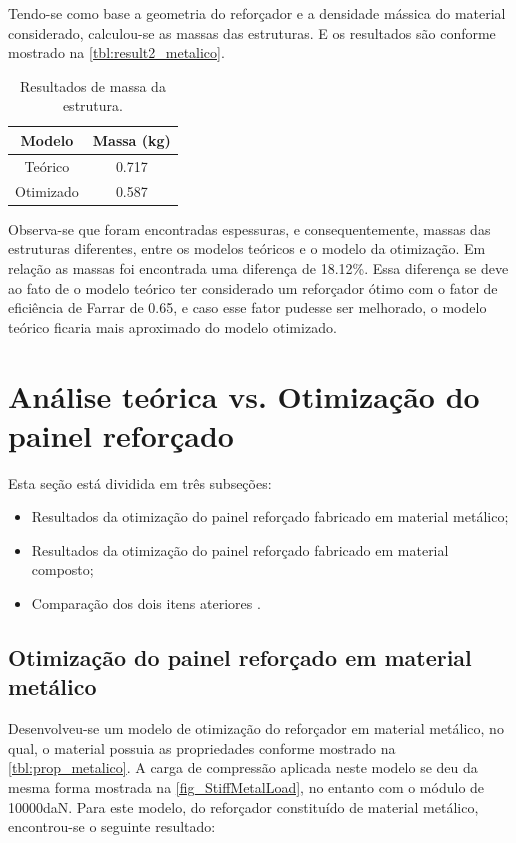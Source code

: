 Tendo-se como base a geometria do reforçador e a densidade mássica do material considerado, calculou-se as massas das estruturas. E os resultados são conforme mostrado na \autoref{tbl:result2_metalico}.

\begin{table}[h]
\centering
\begin{tabular}{cc}
\toprule
Modelo & Massa (kg) \\ \midrule
Teórico & 0.717\\
Otimizado & 0.587\\
\bottomrule
\end{tabular}
\caption{Resultados de massa da estrutura.}
\label{tbl:result2_metalico}
\end{table}

Observa-se que foram encontradas espessuras, e consequentemente, massas das estruturas diferentes, entre os modelos teóricos e o modelo da otimização.
Em relação as massas foi encontrada uma diferença de 18.12\%. Essa diferença se deve ao fato de o modelo teórico ter considerado um reforçador ótimo com o fator de eficiência de Farrar de 0.65, e caso esse fator pudesse ser melhorado, o modelo teórico ficaria mais aproximado do modelo otimizado.

\section{Análise teórica vs. Otimização do painel reforçado}
Esta seção está dividida em três subseções:
\begin{itemize}
\item Resultados da otimização do painel reforçado fabricado em material metálico;
\item Resultados da otimização do painel reforçado fabricado em material composto;
\item Comparação dos dois itens ateriores .
\end{itemize}

\subsection{Otimização do painel reforçado em material metálico}
Desenvolveu-se um modelo de otimização do reforçador em material metálico, no qual, o material possuia as propriedades conforme mostrado na \autoref{tbl:prop_metalico}. A carga de compressão aplicada neste modelo se deu da mesma forma mostrada na \autoref{fig_StiffMetalLoad}, no entanto com o módulo de 10000daN. Para este modelo, do reforçador constituído de material metálico, encontrou-se o seguinte resultado:\

